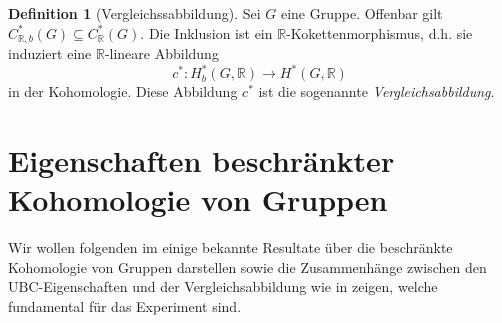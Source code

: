 \documentclass[a4paper,twoside,10pt]{scrreprt}
\newcommand{\R}{\mathbb{R}}
\theoremstyle{definition}
\newtheorem{definition}[satz]{Definition}
\begin{document}
\begin{definition}[Vergleichssabbildung]
Sei $G$ eine Gruppe.
Offenbar gilt $C_{\R,b}^*(G)\subseteq C_{\R}^*(G)$. Die Inklusion ist ein $\R$-Kokettenmorphismus, d.h. sie induziert eine $\R$-lineare Abbildung 
\begin{equation*}
c^*:H_b^*(G,\R)\to H^*(G,\R)
\end{equation*}
in der Kohomologie. Diese Abbildung $c^*$ ist die sogenannte \emph{Vergleichsabbildung}.
\end{definition}

\chapter{Eigenschaften beschränkter Kohomologie von Gruppen}
Wir wollen folgenden im einige bekannte Resultate über die beschränkte Kohomologie von Gruppen darstellen sowie die Zusammenhänge zwischen den $\text{UBC}$-Eigenschaften und der Vergleichsabbildung wie in \cite[Theorem 2.8]{matsumoto} zeigen, welche fundamental für das Experiment sind.
\end{document}
